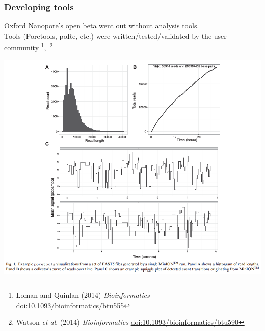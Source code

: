 \begin{frame}
  \frametitle{Developing tools}
  Oxford Nanopore's open beta went out without analysis tools.\\
  Tools (Poretools, poRe, etc.) were written/tested/validated by the user community%
  \footnote{\tiny{Loman and Quinlan (2014) \textit{Bioinformatics} \href{http://dx.doi.org/10.1093/bioinformatics/btu555}{doi:10.1093/bioinformatics/btu555}}}$,$%
  \footnote{\tiny{Watson \textit{et al}. (2014) \textit{Bioinformatics} \href{http://dx.doi.org/10.1093/bioinformatics/btu590}{doi:10.1093/bioinformatics/btu590}}}
    \begin{center}
      \includegraphics[height=0.55\textheight]{images/poretools}
    \end{center}           
\end{frame}

